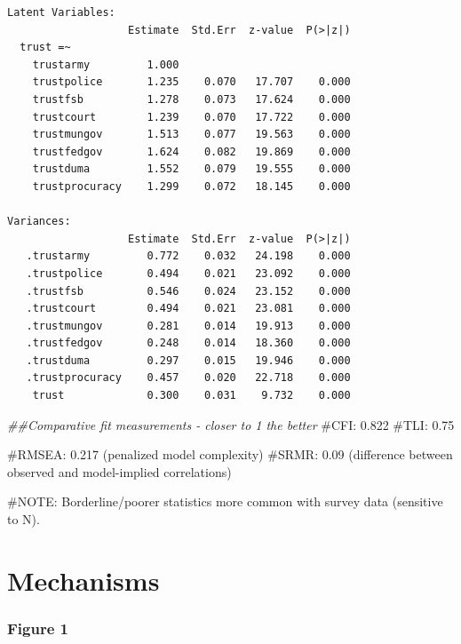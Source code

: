 \documentclass[
  letterpaper,
  DIV=11,
  numbers=noendperiod]{scrartcl}
\newenvironment{Shaded}{\begin{snugshade}}{\end{snugshade}}
\newcommand{\CommentTok}[1]{\textcolor[rgb]{0.37,0.37,0.37}{#1}}
\newcommand{\DocumentationTok}[1]{\textcolor[rgb]{0.37,0.37,0.37}{\textit{#1}}}
\begin{document}
\begin{verbatim}
Latent Variables:
                   Estimate  Std.Err  z-value  P(>|z|)
  trust =~                                            
    trustarmy         1.000                           
    trustpolice       1.235    0.070   17.707    0.000
    trustfsb          1.278    0.073   17.624    0.000
    trustcourt        1.239    0.070   17.722    0.000
    trustmungov       1.513    0.077   19.563    0.000
    trustfedgov       1.624    0.082   19.869    0.000
    trustduma         1.552    0.079   19.555    0.000
    trustprocuracy    1.299    0.072   18.145    0.000

Variances:
                   Estimate  Std.Err  z-value  P(>|z|)
   .trustarmy         0.772    0.032   24.198    0.000
   .trustpolice       0.494    0.021   23.092    0.000
   .trustfsb          0.546    0.024   23.152    0.000
   .trustcourt        0.494    0.021   23.081    0.000
   .trustmungov       0.281    0.014   19.913    0.000
   .trustfedgov       0.248    0.014   18.360    0.000
   .trustduma         0.297    0.015   19.946    0.000
   .trustprocuracy    0.457    0.020   22.718    0.000
    trust             0.300    0.031    9.732    0.000
\end{verbatim}

\begin{Shaded}
\begin{Highlighting}[]
\DocumentationTok{\#\#Comparative fit measurements {-} closer to 1 the better}
\CommentTok{\#CFI: 0.822}
\CommentTok{\#TLI: 0.75}

\CommentTok{\#RMSEA: 0.217 (penalized model complexity)}
\CommentTok{\#SRMR: 0.09 (difference between observed and model{-}implied correlations)}

\CommentTok{\#NOTE: Borderline/poorer statistics more common with survey data (sensitive to N).}
\end{Highlighting}
\end{Shaded}

\section{Mechanisms}\label{mechanisms}

\subsubsection{Figure 1}\label{figure-1}
\end{document}
